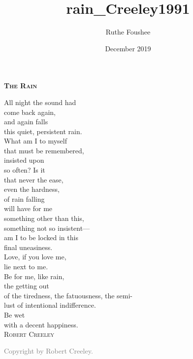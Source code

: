 \documentclass[12pt]{memoir}
\title{rain_Creeley1991}
\author{Ruthe Foushee}
\date{December 2019}
\begin{document}
\thispagestyle{empty}
\noindent \textbf{\textsc{\Large The Rain }}
\vspace{18pt}

All night the sound had\\
come back again,\\
and again falls\\
this quiet, persistent rain.\\
 
What am I to myself\\
that must be remembered,\\
insisted upon\\
so often? Is it\\
 
that never the ease,\\
even the hardness,\\
of rain falling\\
will have for me\\
 
something other than this,\\
something not so insistent---\\
am I to be locked in this\\
final uneasiness.\\
 
Love, if you love me,\\
lie next to me.\\
Be for me, like rain,\\
the getting out\\
 
of the tiredness, the fatuousness, the semi-\\
lust of intentional indifference.\\
Be wet\\
with a decent happiness.\\

\vspace{22pt}
\hspace{62pt} \textsc{Robert Creeley}\\
\vfill
\noindent\footnotesize{

\textcolor{gray}{Copyright  by Robert Creeley.}} 
\end{document}
